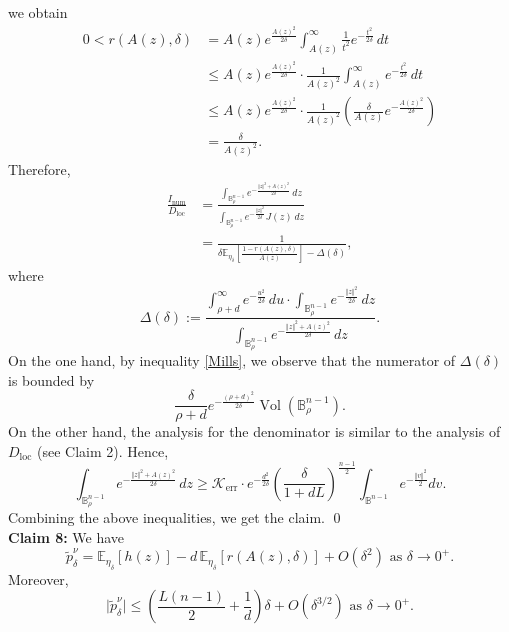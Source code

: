 \documentclass[11pt]{amsart}
\newcommand{\1}{\mathds{1}}
\theoremstyle{definition}
\theoremstyle{remark}
\theoremstyle{definition}
\begin{document}
we obtain
\begin{equation*}
\begin{aligned}
0<r(A(z),\delta)&=A(z)e^{\frac{A(z)^2}{2\delta}}\int_{A(z)}^{\infty} \frac{1}{t^2}e^{-\frac{t^2}{2\delta}}\,dt\\
&\leq A(z)e^{\frac{A(z)^2}{2\delta}}\cdot \frac{1}{A(z)^2}\int_{A(z)}^{\infty} e^{-\frac{t^2}{2\delta}}\,dt\\
&\leq A(z)e^{\frac{A(z)^2}{2\delta}}\cdot \frac{1}{A(z)^2}\left(\frac{\delta}{A(z)}e^{-\frac{A(z)^2}{2\delta}}\right)\\
&=\frac{\delta}{A(z)^2}.
\end{aligned}
\end{equation*}
Therefore,
\begin{equation*}
    \begin{aligned}
 \frac{I_{\operatorname{num}}}{D_{\operatorname{loc}}}&=\frac{\int_{\mathbb{B}^{n-1}_{\rho}} e^{-\frac{\Vert z\Vert^2+A(z)^2}{2\delta}}\,dz }{\int_{\mathbb{B}^{n-1}_{\rho}} e^{-\frac{\Vert z\Vert^2}{2\delta}}J(z)\,dz}\\
 &=\frac{1}{\delta \mathbb{E}_{\eta_{\delta}}\left[\frac{1-r(A(z),\delta)}{A(z)}\right]-\Delta(\delta)},
     \end{aligned}
\end{equation*}
where
$$
\Delta(\delta):=\frac{\int_{\rho+d}^{\infty} e^{-\frac{u^2}{2\delta}}\,du \cdot \int_{\mathbb{B}^{n-1}_{\rho}} e^{-\frac{\Vert z\Vert^2}{2\delta}}\,dz}{\int_{\mathbb{B}^{n-1}_{\rho}} e^{-\frac{\Vert z\Vert^2+A(z)^2}{2\delta}}\,dz}.
$$
On the one hand, by inequality \eqref{Mills}, we observe that the numerator of $\Delta(\delta)$ is bounded by
$$
\frac{\delta}{\rho+d}e^{-\frac{(\rho+d)^2}{2\delta}} \operatorname{Vol}(\mathbb{B}^{n-1}_{\rho}).
$$
On the other hand, the analysis for the denominator is similar to the analysis of $D_{\operatorname{loc}}$ (see Claim 2). Hence,
$$
\int_{\mathbb{B}^{n-1}_{\rho}} e^{-\frac{\Vert z\Vert^2+A(z)^2}{2\delta}}\,dz\geq \mathcal{K}_{\operatorname{err}}\cdot e^{-\frac{d^2}{2\delta}} \left(\frac{\delta}{1+dL}\right)^{\frac{n-1}{2}}  \int_{\mathbb{B}^{n-1}}e^{-\frac{\Vert v\Vert^2}{2}}dv.
$$
Combining the above inequalities, we get the claim. \qed\\
\textbf{Claim 8:} We have
\[
\tilde{p}_{\delta}^{\nu}
=
\mathbb{E}_{\eta_{\delta}}[h(z)]
- d\,\mathbb{E}_{\eta_{\delta}}\!\left[r(A(z),\delta)\right] 
+ O(\delta^{2}) \textrm{ as } \delta \to 0^+.
\]
Moreover,  
$$
\vert \tilde{p}_{\delta}^{\nu}\vert \leq \left(\frac{L(n-1)}{2}+\frac{1}{d}\right)\delta +O(\delta^{3/2}) \textrm{ as } \delta \to 0^+.
$$
\end{document}
